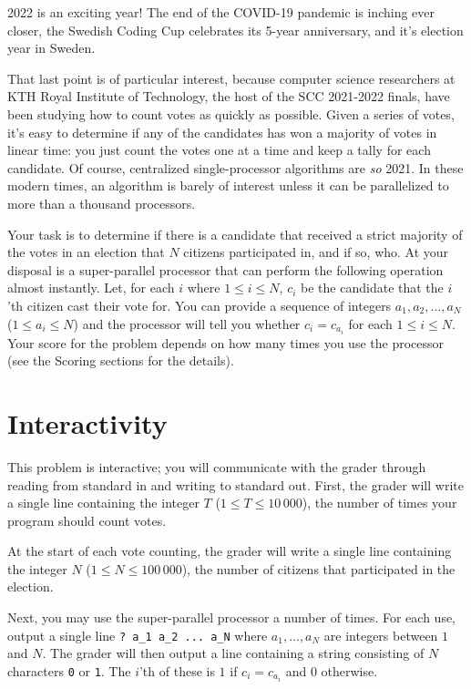2022 is an exciting year!
The end of the COVID-19 pandemic is inching ever closer, the Swedish Coding Cup celebrates its 5-year anniversary, and it's election year in Sweden.

That last point is of particular interest, because computer science researchers at KTH Royal Institute of Technology, the host of the SCC 2021-2022 finals, have been studying how to count votes as quickly as possible.
Given a series of votes, it's easy to determine if any of the candidates has won a majority of votes in linear time: you just count the votes one at a time and keep a tally for each candidate.
Of course, centralized single-processor algorithms are \emph{so} 2021.
In these modern times, an algorithm is barely of interest unless it can be parallelized to more than a thousand processors.

Your task is to determine if there is a candidate that received a strict majority of the votes in an election that $N$ citizens participated in, and if so, who.
At your disposal is a super-parallel processor that can perform the following operation almost instantly.
Let, for each $i$ where $1 \le i \le N$, $c_i$ be the candidate that the $i$'th citizen cast their vote for.
You can provide a sequence of integers $a_1, a_2, \dots, a_N$ ($1 \le a_i \le N$) and the processor will tell you whether $c_i = c_{a_i}$ for each $1 \le i \le N$.
Your score for the problem depends on how many times you use the processor (see the Scoring sections for the details).

\section*{Interactivity}
This problem is interactive; you will communicate with the grader through reading from standard in and writing to standard out.
First, the grader will write a single line containing the integer $T$ ($1 \le T \le 10\,000$), the number of times your program should count votes.

At the start of each vote counting, the grader will write a single line containing the integer $N$ ($1 \le N \le 100\,000$), the number of citizens that participated in the election.

Next, you may use the super-parallel processor a number of times.
For each use, output a single line \texttt{? a\_1 a\_2 ... a\_N} where $a_1, \dots, a_N$ are integers between $1$ and $N$.
The grader will then output a line containing a string consisting of $N$ characters \texttt{0} or \texttt{1}.
The $i$'th of these is $1$ if $c_i = c_{a_i}$ and $0$ otherwise.

